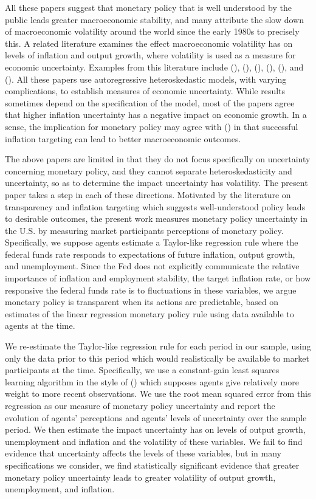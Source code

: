 \documentclass[12pt]{article}
\newcommand{\citee}[1]{\citeauthor{#1} (\citeyear{#1})}
\begin{document}
All these papers suggest that monetary policy that is well understood by the public leads greater macroeconomic stability, and many attribute the slow down of macroeconomic volatility around the world since the early 1980s to precisely this.  A related literature examines the effect macroeconomic volatility has on levels of inflation and output growth, where volatility is used as a measure for economic uncertainty.  Examples from this literature include \citee{grier_perry2000}, \citee{fountas2001}, \citee{fountas2002}, \citee{grier2004}, \citee{fountas2006}, and \citee{fountas2007}.  All these papers use autoregressive heteroskedastic models, with varying complications, to establish measures of economic uncertainty.  While results sometimes depend on the specification of the model, most of the papers agree that higher inflation uncertainty has a negative impact on economic growth.  In a sense, the implication for monetary policy may agree with \citee{bernanke1997} in that successful inflation targeting can lead to better macroeconomic outcomes.

The above papers are limited in that they do not focus specifically on uncertainty concerning monetary policy, and they cannot separate heteroskedasticity and uncertainty, so as to determine the impact uncertainty has volatility.  The present paper takes a step in each of these directions.  Motivated by the literature on transparency and inflation targeting which suggests well-understood policy leads to desirable outcomes, the present work measures monetary policy uncertainty in the U.S. by measuring market participants perceptions of monetary policy.  Specifically, we suppose agents estimate a Taylor-like regression rule where the federal funds rate responds to expectations of future inflation, output growth, and unemployment.  Since the Fed does not explicitly communicate the relative importance of inflation and employment stability, the target inflation rate, or how responsive the federal funds rate is to fluctuations in these variables, we argue monetary policy is transparent when its actions are predictable, based on estimates of the linear regression monetary policy rule using data available to agents at the time.  

We re-estimate the Taylor-like regression rule for each period in our sample, using only the data prior to this period which would realistically be available to market participants at the time.  Specifically, we use a constant-gain least squares learning algorithm in the style of \citee{evanshonka2001} which supposes agents give relatively more weight to more recent observations.  We use the root mean squared error from this regression as our measure of monetary policy uncertainty and report the evolution of agents' perceptions and agents' levels of uncertainty over the sample period.  We then estimate the impact uncertainty has on levels of output growth, unemployment and inflation and the volatility of these variables.  We fail to find evidence that uncertainty affects the levels of these variables, but in many specifications we consider, we find statistically significant evidence that greater monetary policy uncertainty leads to greater volatility of output growth, unemployment, and inflation.
\end{document}

